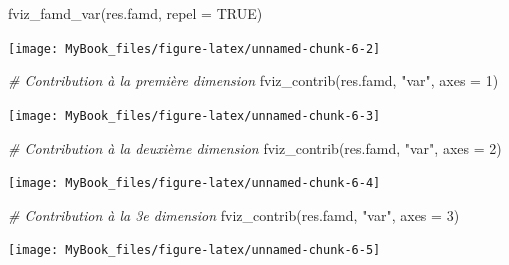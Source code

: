 \documentclass[
  12pt,
  american,
  a4paper,
  extrafontsizes,onecolumn,openright
  ]{memoir}
\newenvironment{Shaded}{\begin{snugshade}}{\end{snugshade}}
\newcommand{\AttributeTok}[1]{\textcolor[rgb]{0.77,0.63,0.00}{#1}}
\newcommand{\CommentTok}[1]{\textcolor[rgb]{0.56,0.35,0.01}{\textit{#1}}}
\newcommand{\ConstantTok}[1]{\textcolor[rgb]{0.00,0.00,0.00}{#1}}
\newcommand{\DecValTok}[1]{\textcolor[rgb]{0.00,0.00,0.81}{#1}}
\newcommand{\FunctionTok}[1]{\textcolor[rgb]{0.00,0.00,0.00}{#1}}
\newcommand{\NormalTok}[1]{#1}
\newcommand{\StringTok}[1]{\textcolor[rgb]{0.31,0.60,0.02}{#1}}
\begin{document}
\begin{Shaded}
\begin{Highlighting}[]
\FunctionTok{fviz\_famd\_var}\NormalTok{(res.famd, }\AttributeTok{repel =} \ConstantTok{TRUE}\NormalTok{)}
\end{Highlighting}
\end{Shaded}

\begin{center}\texttt{[image: MyBook\_files/figure-latex/unnamed-chunk-6-2]} \end{center}

\begin{Shaded}
\begin{Highlighting}[]
\CommentTok{\# Contribution à la première dimension}
\FunctionTok{fviz\_contrib}\NormalTok{(res.famd, }\StringTok{"var"}\NormalTok{, }\AttributeTok{axes =} \DecValTok{1}\NormalTok{)}
\end{Highlighting}
\end{Shaded}

\begin{center}\texttt{[image: MyBook\_files/figure-latex/unnamed-chunk-6-3]} \end{center}

\begin{Shaded}
\begin{Highlighting}[]
\CommentTok{\# Contribution à la deuxième dimension}
\FunctionTok{fviz\_contrib}\NormalTok{(res.famd, }\StringTok{"var"}\NormalTok{, }\AttributeTok{axes =} \DecValTok{2}\NormalTok{)}
\end{Highlighting}
\end{Shaded}

\begin{center}\texttt{[image: MyBook\_files/figure-latex/unnamed-chunk-6-4]} \end{center}

\begin{Shaded}
\begin{Highlighting}[]
\CommentTok{\# Contribution à la 3e dimension}
\FunctionTok{fviz\_contrib}\NormalTok{(res.famd, }\StringTok{"var"}\NormalTok{, }\AttributeTok{axes =} \DecValTok{3}\NormalTok{)}
\end{Highlighting}
\end{Shaded}

\begin{center}\texttt{[image: MyBook\_files/figure-latex/unnamed-chunk-6-5]} \end{center}

\normalsize
\end{document}
